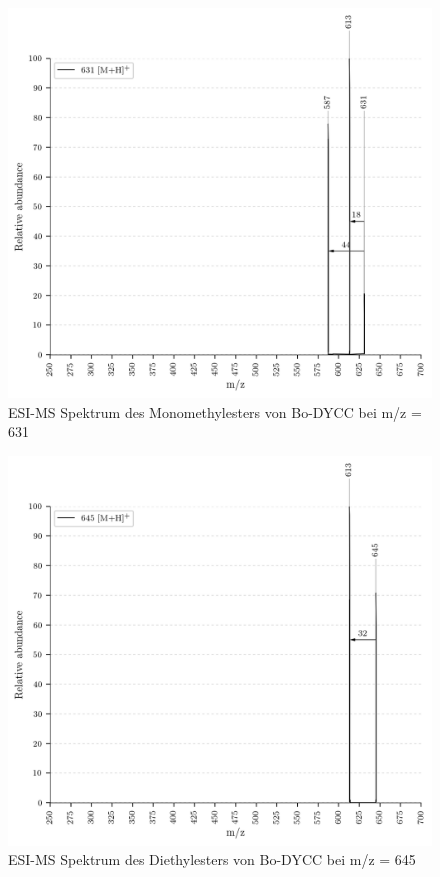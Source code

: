 \begin{figure}[!htbp]
  \centering
  \includegraphics[width=\textwidth, height=0.7\textwidth]{figures/Kapitel7/Kataboliten/VWA_MS_631.png}
  \caption[ESI-MS Spektrum des Monomethylesters von Bo-DYCC, Quelle: Author]{ESI-MS Spektrum des Monomethylesters von Bo-DYCC bei m/z = 631}
  \label{fig:631MH}
\end{figure}

\begin{figure}[!htbp]
  \centering
  \includegraphics[width=\textwidth, height=0.6\textwidth]{figures/Kapitel7/Kataboliten/VWA_MS_645-2.png}
  \caption[ESI-MS Spektrum des Diethylesters von Bo-DYCC, Quelle: Author]{ESI-MS Spektrum des Diethylesters von Bo-DYCC bei m/z = 645}
  \label{fig:645MH}
\end{figure}


